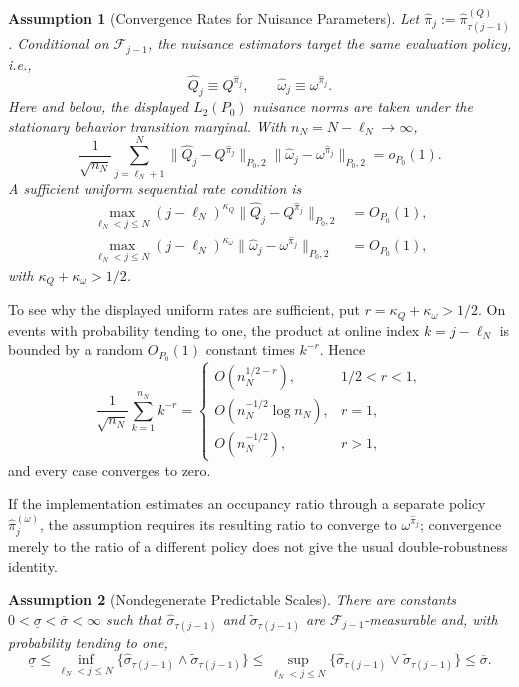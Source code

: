 \documentclass[12pt]{article}
\newtheorem{assumption}{Assumption}
\theoremstyle{remark}\newtheorem{remark}[theorem]{Remark}\theoremstyle{plain}
\begin{document}
\begin{assumption}[Convergence Rates for Nuisance Parameters]\label{ass:nui_rates}
    Let $\widehat\pi_j:=\widehat{\pi}_{\tau(j-1)}^{(Q)}$.
    Conditional on $\mathcal F_{j-1}$, the nuisance estimators target
    the same evaluation policy, i.e.,
    \[
        \widehat Q_j \equiv Q^{\widehat\pi_j},
        \qquad
        \widehat\omega_j \equiv \omega^{\widehat\pi_j}.
    \]
    Here and below, the displayed $L_2(P_0)$ nuisance norms are taken
    under the stationary behavior transition marginal.
    With $n_N=N-\ell_N\to\infty$,
    \[
        \frac{1}{\sqrt{n_N}}
        \sum_{j=\ell_N+1}^N
        \|\widehat Q_j-Q^{\widehat\pi_j}\|_{P_0,2}
        \|\widehat\omega_j-\omega^{\widehat\pi_j}\|_{P_0,2}
        =o_{P_0}(1).
    \]
    A sufficient uniform sequential rate condition is
    \[
        \begin{aligned}
        \max_{\ell_N<j\leq N}
        (j-\ell_N)^{\kappa_Q}
        \|\widehat Q_j-Q^{\widehat\pi_j}\|_{P_0,2}
        &=O_{P_0}(1),\\
        \max_{\ell_N<j\leq N}
        (j-\ell_N)^{\kappa_\omega}
        \|\widehat\omega_j-\omega^{\widehat\pi_j}\|_{P_0,2}
        &=O_{P_0}(1),
        \end{aligned}
    \]
    with $\kappa_Q+\kappa_\omega>1/2$.
\end{assumption}

To see why the displayed uniform rates are sufficient, put
$r=\kappa_Q+\kappa_\omega>1/2$.  On events with probability tending
to one, the product at online index
$k=j-\ell_N$ is bounded by a random $O_{P_0}(1)$ constant times
$k^{-r}$.  Hence
\[
    \frac1{\sqrt{n_N}}\sum_{k=1}^{n_N}k^{-r}
    =
    \begin{cases}
    O(n_N^{1/2-r}),&1/2<r<1,\\
    O(n_N^{-1/2}\log n_N),&r=1,\\
    O(n_N^{-1/2}),&r>1,
    \end{cases}
\]
and every case converges to zero.

If the implementation estimates an occupancy ratio through a separate
policy $\widehat\pi_j^{(\omega)}$, the assumption requires its resulting
ratio to converge to $\omega^{\widehat\pi_j}$; convergence merely to
the ratio of a different policy does not give the usual
double-robustness identity.

\begin{assumption}[Nondegenerate Predictable Scales]
\label{ass:non_zero_var}
    There are constants $0<\underline\sigma<\overline\sigma<\infty$
    such that $\widehat\sigma_{\tau(j-1)}$ and
    $\widetilde\sigma_{\tau(j-1)}$ are
    $\mathcal F_{j-1}$-measurable and, with probability tending to
    one,
    \[
        \underline\sigma
        \leq
        \inf_{\ell_N<j\leq N}
        \{\widehat\sigma_{\tau(j-1)}
        \wedge\widetilde\sigma_{\tau(j-1)}\}
        \leq
        \sup_{\ell_N<j\leq N}
        \{\widehat\sigma_{\tau(j-1)}
        \vee\widetilde\sigma_{\tau(j-1)}\}
        \leq\overline\sigma.
    \]
\end{assumption}
\end{document}
